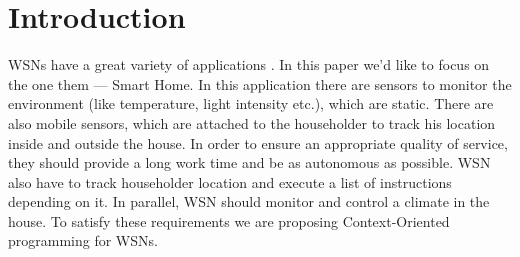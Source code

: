 \documentclass{ubicomp-ext}
\begin{document}
\begin{abstract}
\end{abstract}
\section{Introduction}
WSNs have a great variety of applications \cite{pastor08}. In this paper we'd like to focus on the one them --- Smart Home. In this application there are sensors to monitor the environment (like temperature, light intensity etc.), which are static. There are also mobile sensors, which are attached to the householder to track his location inside and outside the house. In order to ensure an appropriate quality of service, they should provide a long work time and be as autonomous as possible. WSN also have to track householder location and execute a list of instructions depending on it. In parallel, WSN should monitor and control a climate in the house. To satisfy these requirements we are proposing Context-Oriented programming for WSNs.
\end{document}
